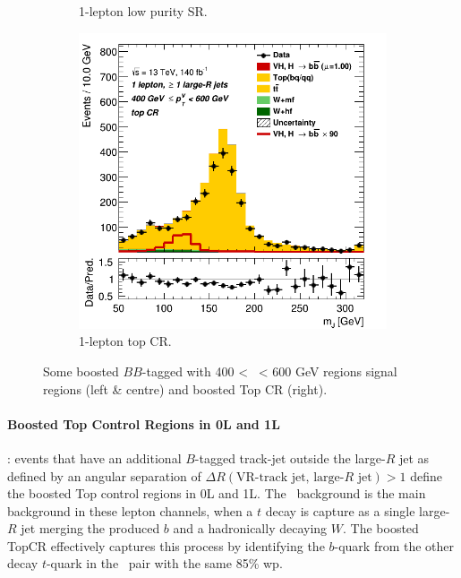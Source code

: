 \begin{figure}[h!]
\begin{subfigure}[b]{0.32\textwidth}
      \caption{1-lepton low purity SR.}
      \label{fig:plots_VHboost_ex_1L_SR}
  \end{subfigure}
  \begin{subfigure}[b]{0.32\textwidth}
    \centering
    \includegraphics[width=\textwidth]{Images/VH/Own_fit/prefit_VHbb/Region_distmBB_BMax600_BMin400_incFat1_Fat1_DSRtopaddbjetcr_J0_TTypebb_incJet1_T2_L1_Y6051_Prefit.png}
    \caption{1-lepton top CR.}
    \label{fig:plots_VHboost_ex_1L_top}
\end{subfigure}
  \caption{Some boosted $BB$-tagged with 400 < \ptv\ < 600 GeV regions signal regions (left \& centre) and boosted Top CR (right).}
  \label{fig:plots_VHboost_ex}
\end{figure} 

\paragraph{Boosted Top Control Regions in 0L and 1L}: events that have an additional $B$-tagged track-jet outside the large-$R$ jet as defined by an angular separation of $\Delta R(\textrm{VR-track jet, large-}R\textrm{ jet}) > 1$
define the boosted Top control regions in 0L and 1L. The \ttb\ background is the main background in these lepton channels, when a $t$ decay is capture as a single large-$R$ jet merging the produced $b$ and a hadronically decaying $W$. The boosted TopCR effectively captures this process by identifying the $b$-quark from the other decay $t$-quark in the \ttb\ pair with the same 85\% \gls{wp}.\\

